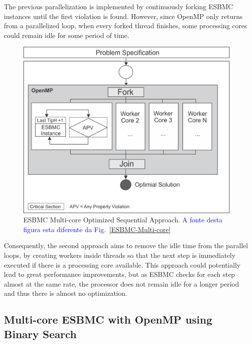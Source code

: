 The previous parallelization is implemented by continuously forking ESBMC instances until the first violation is found. However, since OpenMP only returns from a parallelized loop, when every forked thread finishes, some processing cores could remain idle for some period of time.

\begin{figure}[ht]
	\centering
  \includegraphics[scale=0.75]{Image/esbmc-parallel.png} 
	\caption{ESBMC Multi-core Optimized Sequential Approach. \textcolor{blue}{A fonte desta figura esta diferente da Fig.~\ref{ESBMC-Multi-core}}}
	\label{ESBMC-Multi-core-Optimized-Sequential-Approach}
\end{figure}

Consequently, the second approach aims to remove the idle time from the parallel loops, by creating workers inside threads so that the next step is immediately executed if there is a processing core available. This approach could potentially lead to great performance improvements, but as ESBMC checks for each step almost at the same rate, the processor does not remain idle for a longer period and thus there is almost no optimization.

\subsection{Multi-core ESBMC with OpenMP using Binary Search}
\label{Multi-core-ESBMC-with-OpenMP-using-Binary-Search}

